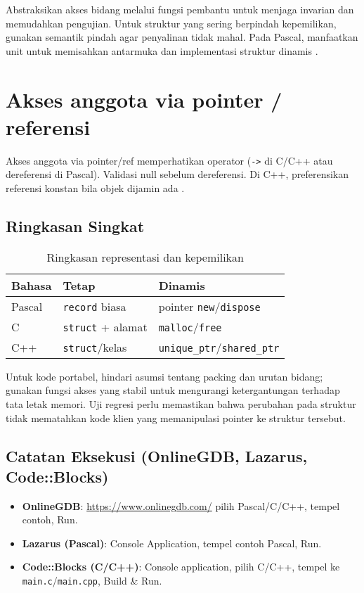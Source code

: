 \documentclass[../main.tex]{subfiles}
\begin{document}
Abstraksikan akses bidang melalui fungsi pembantu untuk menjaga invarian dan memudahkan pengujian. Untuk struktur yang sering berpindah kepemilikan, gunakan semantik pindah agar penyalinan tidak mahal. Pada Pascal, manfaatkan unit untuk memisahkan antarmuka dan implementasi struktur dinamis \parencite{free-pascal-docs}.

\section{Akses anggota via pointer / referensi}
Akses anggota via pointer/ref memperhatikan operator (\texttt{->} di C/C++ atau dereferensi di Pascal). Validasi null sebelum dereferensi. Di C++, preferensikan referensi konstan bila objek dijamin ada \parencite{gnu-c-manual,cpp-reference}.

\subsection{Ringkasan Singkat}
\begin{table}[h]
  \centering
  \caption{Ringkasan representasi dan kepemilikan}
  \begin{tabular}{@{}lll@{}}
    \toprule
    Bahasa & Tetap & Dinamis \\
    \midrule
    Pascal & \texttt{record} biasa & pointer \texttt{new}/\texttt{dispose} \\
    C & \texttt{struct} + alamat & \texttt{malloc}/\texttt{free} \\
    C++ & \texttt{struct}/kelas & \texttt{unique\_ptr}/\texttt{shared\_ptr} \\
    \bottomrule
  \end{tabular}
\end{table}

Untuk kode portabel, hindari asumsi tentang packing dan urutan bidang; gunakan fungsi akses yang stabil untuk mengurangi ketergantungan terhadap tata letak memori. Uji regresi perlu memastikan bahwa perubahan pada struktur tidak mematahkan kode klien yang memanipulasi pointer ke struktur tersebut.
\subsection{Catatan Eksekusi (OnlineGDB, Lazarus, Code::Blocks)}
\begin{itemize}
  \item \textbf{OnlineGDB}: \url{https://www.onlinegdb.com/} \textrightarrow{} pilih Pascal/C/C++, tempel contoh, Run.
  \item \textbf{Lazarus (Pascal)}: Console Application, tempel contoh Pascal, Run.
  \item \textbf{Code::Blocks (C/C++)}: Console application, pilih C/C++, tempel ke \texttt{main.c}/\texttt{main.cpp}, Build \& Run.
\end{itemize}
\end{document}
